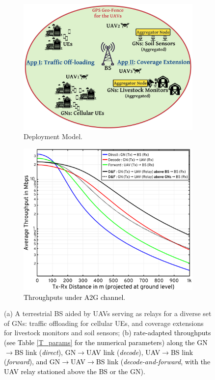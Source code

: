 \documentclass[10pt, twocolumn]{IEEEtran}
\theoremstyle{plain}
\theoremstyle{definition}
\theoremstyle{remark}
\newcommand\hlt[1]{\textcolor{black}{#1}}
\begin{document}
\begin{figure} [t]
    \begin{subfigure}{0.505\linewidth}
        \centering
        \includegraphics[width=1.0\linewidth]{figs/Deployment_Model.jpeg}
        \caption{Deployment Model.}
        \label{F1}
    \end{subfigure}
    \hfill
    \begin{subfigure}{0.44\linewidth}
        \centering
        \includegraphics[width=1.0\linewidth]{figs/Channel_Model.jpg}
        \caption{\hlt{Throughputs under A2G channel.}}
        \label{F2}
    \end{subfigure}
    \caption{(a) A terrestrial BS aided by UAVs serving as relays for a diverse set of GNs: traffic offloading for cellular UEs, and coverage extensions for livestock monitors and soil sensors; \hlt{(b) rate-adapted throughputs (see Table \ref{T_params} for the numerical parameters) along the GN${\rightarrow}$BS link (\emph{direct}), GN${\rightarrow}$UAV link (\emph{decode}),  UAV${\rightarrow}$BS link (\emph{forward}), and GN${\rightarrow}$UAV${\rightarrow}$BS link (\emph{decode-and-forward}, with the UAV relay stationed above the BS or the GN).}}
    \vspace{-6mm}
    \label{F1andF2}
\end{figure}
\end{document}
